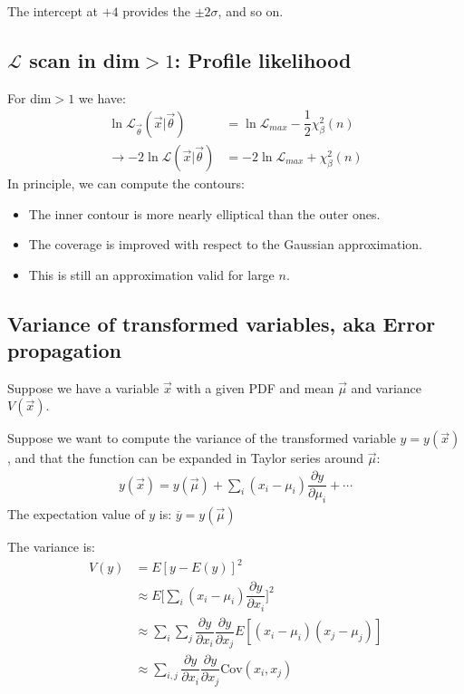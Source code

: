 The intercept at $+4$ provides the $\pm2\sigma$, and so on. 

\subsection{$\mathcal{L}$ scan in dim$>1$: Profile likelihood} \label{l_scan_profile_likelihood}
For dim$>1$ we have: 
\begin{align}
    \ln \mathcal{L}_{\vec{\theta}}(\vec{x}|\vec{\theta}) &= \ln\mathcal{L}_{max} - \dfrac{1}{2} \chi^2_\beta(n) \\
    \to -2 \ln \mathcal{L}(\vec{x}|\vec{\theta}) &= -2\ln\mathcal{L}_{max} + \chi^2_\beta(n)
\end{align}
In principle, we can compute the contours: 

\begin{itemize}[$\to$]
    \item The inner contour is more nearly elliptical than the outer ones.
    \item The coverage is improved with respect to the Gaussian approximation. 
    \item This is still an approximation valid for large $n$.
\end{itemize}

\subsection{Variance of transformed variables, aka Error propagation} \label{error_prop}
Suppose we have a variable $\vec{x}$ with a given PDF and mean $\vec{\mu}$ and variance $V(\vec{x})$.

Suppose we want to compute the variance of the transformed variable $y=y(\vec{x})$, and that the function can be expanded in Taylor series around $\vec{\mu}$:
\begin{align}
    y(\vec{x}) = y(\vec{\mu}) + \sum \limits_i (x_i - \mu_i) \dfrac{\partial y}{\partial \mu_i} + \cdots
\end{align}
The expectation value of $y$ is: $\overline{y} = y(\vec{\mu})$

The variance is: 
\begin{align}
    V(y) &= E[y-E(y)]^2 \\
    &\approx E\Big [\sum\limits_i (x_i - \mu_i) \dfrac{\partial y}{\partial x_i}\Big]^2 \\
    &\approx \sum\limits_i \sum\limits_j \dfrac{\partial y}{\partial x_i} \dfrac{\partial y}{\partial x_j} E[(x_i - \mu_i)(x_j - \mu_j)] \\
    &\approx \sum\limits_{i,j} \dfrac{\partial y}{\partial x_i} \dfrac{\partial y}{\partial x_j} \mathrm{Cov}(x_i, x_j)
\end{align}

